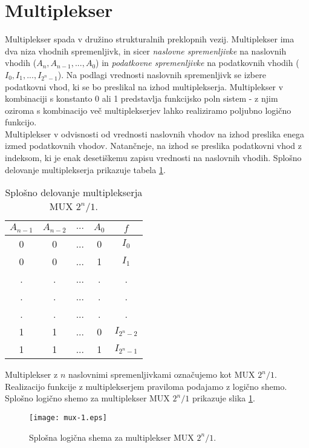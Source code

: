 \section{Multiplekser}
Multiplekser spada v družino strukturalnih preklopnih vezij. Multiplekser ima dva niza vhodnih spremenljivk, in sicer \emph{naslovne spremenljivke} na naslovnih vhodih ($A_n,A_{n-1},...,A_0$) in \emph{podatkovne spremenljivke} na podatkovnih vhodih ($I_0, I_1,..., I_{2^n-1}$). Na podlagi vrednosti naslovnih spremenljivk se izbere podatkovni vhod, ki se bo preslikal na izhod multiplekserja. Multiplekser v kombinaciji s konstanto 0 ali 1 predstavlja funkcijsko poln sistem - z njim oziroma s kombinacijo več multiplekserjev lahko realiziramo poljubno logično funkcijo.\\

Multiplekser v odvisnosti od vrednosti naslovnih vhodov na izhod preslika enega izmed podatkovnih vhodov. Natančneje, na izhod se preslika podatkovni vhod z indeksom, ki je enak desetiškemu zapisu vrednosti na naslovnih vhodih. Splošno delovanje multiplekserja prikazuje tabela \ref{tab:mux_2n1}.\\

\begin{table}[h]
\begin{center}
\begin{tabular}{cccc|c}
$A_{n-1}$ & $A_{n-2}$ & $...$ & $A_{0}$ &  $f$ \\
\hline
0 & 0 & ... & 0 & $I_0$  		\\
0 & 0 & ... & 1 & $I_1$  		\\
. & . & ... & . & .						\\
. & . & ... & . & .						\\
. & . & ... & . & .						\\
1 & 1 & ... & 0 & $I_{2^n-2}$ \\
1 & 1 & ... & 1 & $I_{2^n-1}$ \\
\end{tabular}
\caption{Splošno delovanje multiplekserja MUX $2^n/1$.}
\label{tab:mux_2n1}
\end{center}
\end{table}

Multiplekser z $n$ naslovnimi spremenljivkami označujemo kot MUX $2^n/1$. Realizacijo funkcije z multiplekserjem praviloma podajamo z logično shemo. Splošno logično shemo za multiplekser MUX $2^n/1$
prikazuje slika \ref{fig:mux_2n1}.

\begin{figure}[ht]
\centering
\texttt{[image: mux-1.eps]}
\caption{Splošna logična shema za multiplekser MUX $2^n/1$.}
\label{fig:mux_2n1}
\end{figure}

